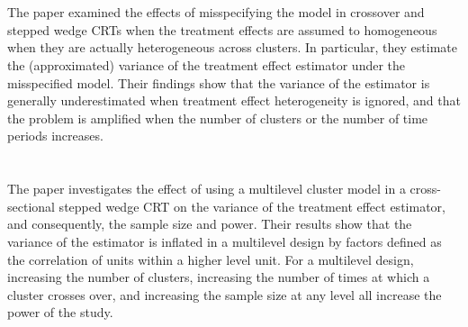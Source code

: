 \documentclass{article}
\begin{document}
\newpage


\section{\textcite{Bowden:2021}}

The paper examined the effects of misspecifying the model in crossover and stepped wedge CRTs when the treatment effects are assumed to homogeneous when they are actually heterogeneous across clusters. In particular, they estimate the (approximated) variance of the treatment effect estimator under the misspecified model. Their findings show that the variance of the estimator is generally underestimated when treatment effect heterogeneity is ignored, and that the problem is amplified when the number of clusters or the number of time periods increases.


\newpage


\section{\textcite{Teerenstra:2019}}

The paper investigates the effect of using a multilevel cluster model in a cross-sectional stepped wedge CRT on the variance of the treatment effect estimator, and consequently, the sample size and power. Their results show that the variance of the estimator is inflated in a multilevel design by factors defined as the correlation of units within a higher level unit. For a multilevel design, increasing the number of clusters, increasing the number of times at which a cluster crosses over, and increasing the sample size at any level all increase the power of the study.


\newpage


\printbibliography
\end{document}
